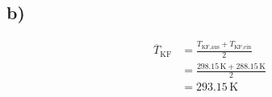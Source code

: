 

\subsection*{b)}
\begin{align*}
\overline{T}_{\text{KF}} & = \frac{T_{\text{KF,aus}} + T_{\text{KF,ein}}}{2} \\
& = \frac{298.15 \, \text{K} + 288.15 \, \text{K}}{2} \\
& = 293.15 \, \text{K}
\end{align*}